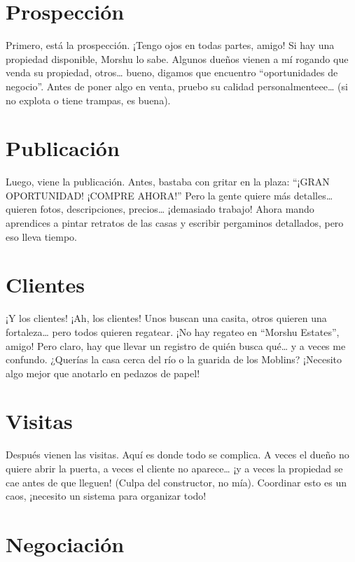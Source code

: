 \documentclass[
  letterpaper,
  DIV=11,
  numbers=noendperiod]{scrreprt}
\begin{document}
\section{Prospección}\label{prospecciuxf3n}

Primero, está la prospección. ¡Tengo ojos en todas partes, amigo! Si hay
una propiedad disponible, Morshu lo sabe. Algunos dueños vienen a mí
rogando que venda su propiedad, otros\ldots{} bueno, digamos que
encuentro ``oportunidades de negocio''. Antes de poner algo en venta,
pruebo su calidad personalmenteee\ldots{} (si no explota o tiene
trampas, es buena).

\section{Publicación}\label{publicaciuxf3n}

Luego, viene la publicación. Antes, bastaba con gritar en la plaza:
``¡GRAN OPORTUNIDAD! ¡COMPRE AHORA!'' Pero la gente quiere más
detalles\ldots{} quieren fotos, descripciones, precios\ldots{}
¡demasiado trabajo! Ahora mando aprendices a pintar retratos de las
casas y escribir pergaminos detallados, pero eso lleva tiempo.

\section{Clientes}\label{clientes-1}

¡Y los clientes! ¡Ah, los clientes! Unos buscan una casita, otros
quieren una fortaleza\ldots{} pero todos quieren regatear. ¡No hay
regateo en ``Morshu Estates'', amigo! Pero claro, hay que llevar un
registro de quién busca qué\ldots{} y a veces me confundo. ¿Querías la
casa cerca del río o la guarida de los Moblins? ¡Necesito algo mejor que
anotarlo en pedazos de papel!

\section{Visitas}\label{visitas}

Después vienen las visitas. Aquí es donde todo se complica. A veces el
dueño no quiere abrir la puerta, a veces el cliente no aparece\ldots{}
¡y a veces la propiedad se cae antes de que lleguen! (Culpa del
constructor, no mía). Coordinar esto es un caos, ¡necesito un sistema
para organizar todo!

\section{Negociación}\label{negociaciuxf3n}
\end{document}

